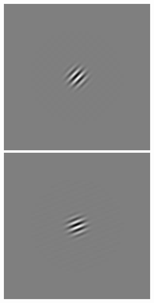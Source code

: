 \begin{figure}[ht]
\begin{center}
 \includegraphics[width=\columnwidth/9]{ch4/figures/rGabor2_2.jpg}
 \includegraphics[width=\columnwidth/9]{ch4/figures/rGabor2_3.jpg}

\end{center}
\end{figure}
